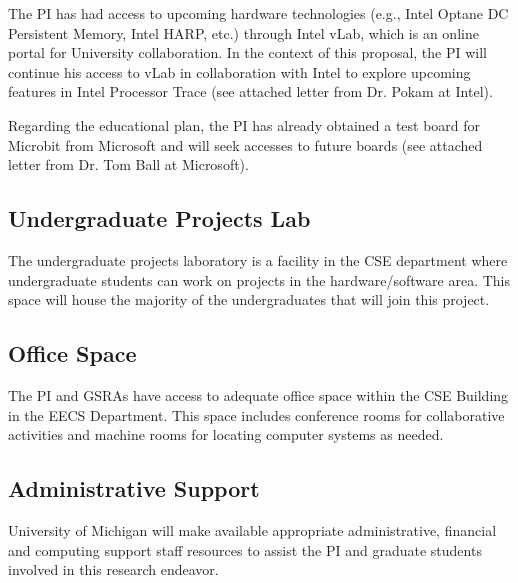 \documentclass{article}
\begin{document}
The PI has had access to upcoming hardware technologies (e.g., Intel Optane DC Persistent Memory, Intel HARP, etc.) through Intel vLab, which is an online portal for University collaboration. In the context of this proposal, the PI will continue his access to vLab in collaboration with Intel to explore upcoming features in Intel Processor Trace (see attached letter from Dr. Pokam at Intel).

Regarding the educational plan, the PI has already obtained a test board for Microbit from Microsoft and will seek accesses to future boards (see attached letter from Dr. Tom Ball at Microsoft).

\subsection*{Undergraduate Projects Lab}

The undergraduate projects laboratory is a facility in the CSE department where undergraduate students can work on projects in the hardware/software area.  This space will house the majority of the undergraduates that will join this project.

\subsection*{Office Space}

The PI and GSRAs have access to adequate office space within the CSE Building in the EECS Department.  This space includes conference rooms for collaborative activities and machine rooms for locating computer systems as needed.  

\subsection*{Administrative Support}

University of Michigan will make available appropriate administrative, financial and
computing support staff resources to assist the PI and graduate students
involved in this research endeavor.
\end{document}
